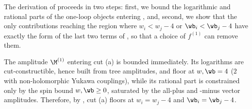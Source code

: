 The derivation of  proceeds in two steps: first, we bound the logarithmic and rational parts of the one-loop objects entering , and, second, we show that the only contributions reaching the region where $w_i < w_j - 4$ or $\wb_i < \wb_j - 4$ have exactly the form of the last two terms of , so that a choice of $f^{(1)}$ can remove them.

The amplitude $\M^{(1)}$ entering cut (a) is bounded immediately.
Its logarithms are cut-constructible, hence built from tree amplitudes, and floor at $w,\wb = 4$ ($2$ with non-holomorphic Yukawa couplings), while its rational part is constrained only by the spin bound $w,\wb \ge 0$, saturated by the all-plus and -minus vector amplitudes.
Therefore, by , cut (a) floors at $w_i = w_j - 4$ and $\wb_i = \wb_j - 4$.

